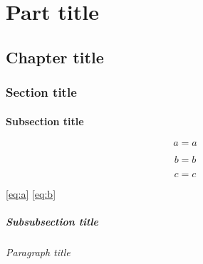 \documentclass[italian,english]{uniud}
\begin{document}
\tableofcontents*

\clearpage

\listoffigures*

\listoftables*


\mainmatter


\part{Part title}

\chapter{Chapter title}
\blindmathtrue

\blindtext

\section{Section title}

\blindtext

\subsection{Subsection title}

\blindtext

\begin{equation}
	\label{eq:a}
	a = a
\end{equation}

\begin{equation}
	\label{eq:b}
	\tag{$\dagger$}
	b = b
\end{equation}

\begin{equation}
	\label{eq:c}
	c = c
\end{equation}

\eqref{eq:a}
\eqref{eq:b}


\subsubsection{Subsubsection title}

\blindtext

\paragraph{Paragraph title}
\end{document}

